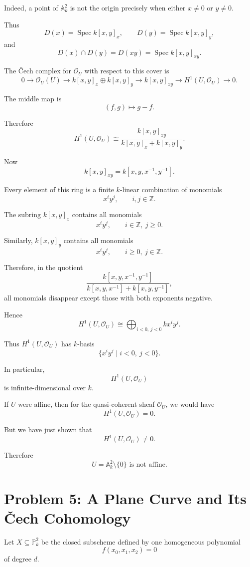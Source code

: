 \documentclass[12pt,a4paper]{article}
\theoremstyle{notespace}
\begin{document}
Indeed, a point of \(\mathbb A_k^2\) is not the origin precisely when either
\(x\neq 0\) or \(y\neq 0\).

Thus
\[
D(x)=\operatorname{Spec}k[x,y]_x,
\qquad
D(y)=\operatorname{Spec}k[x,y]_y,
\]
and
\[
D(x)\cap D(y)=D(xy)=\operatorname{Spec}k[x,y]_{xy}.
\]

The \v{C}ech complex for \(\mathcal O_U\) with respect to this cover is
\[
0
\longrightarrow
\mathcal O_U(U)
\longrightarrow
k[x,y]_x\oplus k[x,y]_y
\longrightarrow
k[x,y]_{xy}
\longrightarrow
H^1(U,\mathcal O_U)
\longrightarrow 0.
\]

The middle map is
\[
(f,g)\longmapsto g-f.
\]

Therefore
\[
H^1(U,\mathcal O_U)
\cong
\frac{k[x,y]_{xy}}{k[x,y]_x+k[x,y]_y}.
\]

Now
\[
k[x,y]_{xy}=k[x,y,x^{-1},y^{-1}].
\]

Every element of this ring is a finite \(k\)-linear combination of monomials
\[
x^iy^j,
\qquad i,j\in\mathbb Z.
\]

The subring \(k[x,y]_x\) contains all monomials
\[
x^iy^j,
\qquad i\in\mathbb Z,\ j\geq0.
\]

Similarly, \(k[x,y]_y\) contains all monomials
\[
x^iy^j,
\qquad i\geq0,\ j\in\mathbb Z.
\]

Therefore, in the quotient
\[
\frac{k[x,y,x^{-1},y^{-1}]}
{k[x,y,x^{-1}]+k[x,y,y^{-1}]},
\]
all monomials disappear except those with both exponents negative.

Hence
\[
H^1(U,\mathcal O_U)
\cong
\bigoplus_{i<0,\ j<0} kx^iy^j.
\]

Thus \(H^1(U,\mathcal O_U)\) has \(k\)-basis
\[
\{x^iy^j\mid i<0,\ j<0\}.
\]

In particular,
\[
H^1(U,\mathcal O_U)
\]
is infinite-dimensional over \(k\).

If \(U\) were affine, then for the quasi-coherent sheaf \(\mathcal O_U\),
we would have
\[
H^1(U,\mathcal O_U)=0.
\]

But we have just shown that
\[
H^1(U,\mathcal O_U)\neq0.
\]

Therefore
\[
\boxed{
	U=\mathbb A_k^2\setminus\{0\}
	\text{ is not affine.}
}
\]

\section{Problem 5: A Plane Curve and Its \v{C}ech Cohomology}

Let \(X\subseteq\mathbb P_k^2\) be the closed subscheme defined by one
homogeneous polynomial
\[
f(x_0,x_1,x_2)=0
\]
of degree \(d\).
\end{document}
